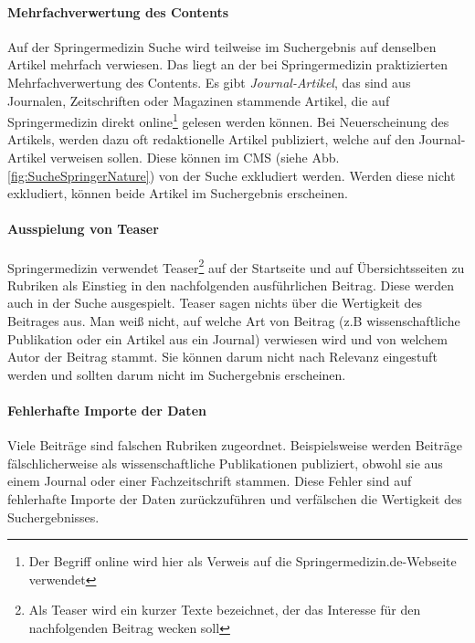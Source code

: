 \paragraph{Mehrfachverwertung des Contents}
Auf der Springermedizin Suche wird teilweise im Suchergebnis auf denselben Artikel mehrfach  verwiesen. Das liegt an der bei Springermedizin praktizierten Mehrfachverwertung des Contents. Es gibt \textit{Journal-Artikel}, das sind aus Journalen, Zeitschriften oder Magazinen stammende Artikel, die auf Springermedizin direkt online\footnote{Der Begriff \glqq online\grqq{} wird hier als Verweis auf die Springermedizin.de-Webseite verwendet} gelesen werden können. Bei Neuerscheinung des Artikels, werden dazu oft redaktionelle Artikel publiziert, welche auf den Journal-Artikel verweisen sollen. Diese können im CMS (siehe Abb. \ref{fig:SucheSpringerNature}) von der Suche exkludiert werden. Werden diese nicht exkludiert, können beide Artikel im Suchergebnis erscheinen.

\paragraph{Ausspielung von Teaser}
Springermedizin verwendet Teaser\footnote{Als Teaser wird ein kurzer Texte bezeichnet, der das Interesse für den nachfolgenden Beitrag wecken soll} auf der Startseite und auf Übersichtsseiten zu Rubriken als Einstieg in den nachfolgenden ausführlichen Beitrag. Diese werden auch in der Suche ausgespielt. Teaser sagen nichts über die Wertigkeit des Beitrages aus. Man weiß nicht, auf welche Art von Beitrag (z.B wissenschaftliche Publikation oder ein Artikel aus ein Journal) verwiesen wird und von welchem Autor der Beitrag stammt. Sie können darum nicht nach Relevanz eingestuft werden und sollten darum nicht im Suchergebnis erscheinen.

\paragraph{Fehlerhafte Importe der Daten}
Viele Beiträge sind falschen Rubriken zugeordnet. Beispielsweise werden Beiträge fälschlicherweise als wissenschaftliche Publikationen publiziert, obwohl sie aus einem Journal oder einer Fachzeitschrift stammen. Diese Fehler sind auf fehlerhafte Importe der Daten zurückzuführen und verfälschen die Wertigkeit des Suchergebnisses.

